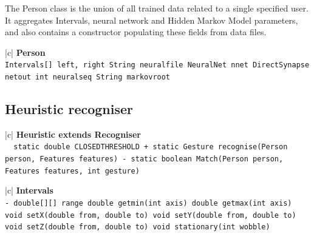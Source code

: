 \documentclass[12pt,a4,notitlepage]{report}
\renewcommand{\_}{\texttt{\symbol{95}}}
\newcommand{\<}{\texttt{\symbol{60}}}
\renewcommand{\>}{\texttt{\symbol{62}}}
\newcommand{\class}[1]{\textbf{#1}}
\newcommand{\variable}[1]{\texttt{#1}}
\begin{document}
The Person class is the union of all trained data related to a single specified user. It aggregates Intervals, neural network and Hidden Markov Model parameters, and also contains a constructor populating these fields from data files.

\begin{tabular}{|c|} \hline 
\class{Person} \\ \hline
{}
{\variable{Intervals[] left, right \newline String neural\_file \newline NeuralNet nnet \newline DirectSynapse netout \newline int neural\_seq  \newline String markov\_root
} } \\ \hline
\end{tabular}

\newpage

\subsection{Heuristic recogniser}

\begin{tabular}{|c|} \hline 
\class{Heuristic extends Recogniser} \\ \hline
{}
{\variable{\ \ static double CLOSED\_THRESHOLD \newline
 + static Gesture recognise(Person person, Features features) \newline
 - static boolean Match(Person person, Features features, int gesture)
} } \\ \hline
\end{tabular}

\begin{tabular}{|c|} \hline 
\class{Intervals} \\ \hline
{}
{\variable{- double[][] range \newline
  double get\_min(int axis) \newline
  double get\_max(int axis) \newline
  void setX(double from, double to) \newline
  void setY(double from, double to) \newline
  void setZ(double from, double to) \newline
  void stationary(int wobble)
} } \\ \hline
\end{tabular}
\end{document}
